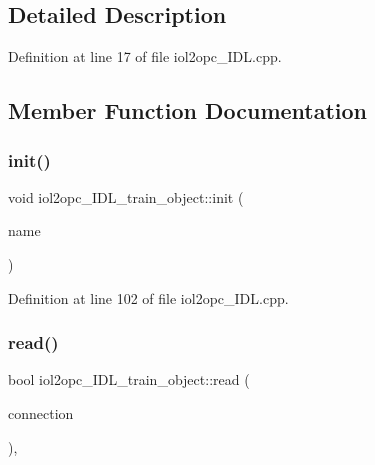 \subsection{Detailed Description}


Definition at line 17 of file iol2opc\+\_\+\+I\+D\+L.\+cpp.



\subsection{Member Function Documentation}
\mbox{\label{classiol2opc__IDL__train__object_a5ff9c578a2582001547215f6ce52900c}} 
\subsubsection{\texorpdfstring{init()}{init()}}
{\footnotesize\ttfamily void iol2opc\+\_\+\+I\+D\+L\+\_\+train\+\_\+object\+::init (\begin{DoxyParamCaption}\item[{const std\+::string \&}]{name }\end{DoxyParamCaption})}



Definition at line 102 of file iol2opc\+\_\+\+I\+D\+L.\+cpp.

\mbox{\label{classiol2opc__IDL__train__object_aed2ae49db44b0549276f97c6806fea0c}} 
\subsubsection{\texorpdfstring{read()}{read()}}
{\footnotesize\ttfamily bool iol2opc\+\_\+\+I\+D\+L\+\_\+train\+\_\+object\+::read (\begin{DoxyParamCaption}\item[{yarp\+::os\+::\+Connection\+Reader \&}]{connection }\end{DoxyParamCaption})\hspace{0.3cm}{\ttfamily [override]}, {\ttfamily [virtual]}}




